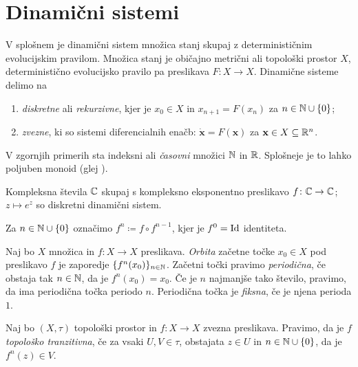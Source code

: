 \section{Dinamični sistemi} \label{sec:dis}

V splošnem je dinamični sistem množica stanj skupaj z determinističnim evolucijskim pravilom. Množica stanj je običajno metrični ali topološki prostor \(X\), deterministično evolucijsko pravilo pa preslikava \(F \colon X \to X\). Dinamične sisteme delimo na

\begin{enumerate}
    \item \emph{diskretne} ali \emph{rekurzivne}, kjer je \(x_0 \in X\) in \(x_{n + 1} = F (x_n)\) za \(n \in \mathbb N \cup \{0\}\);
    \item \emph{zvezne}, ki so sistemi diferencialnih enačb: \(\dot{\mathbf{x}} = F (\mathbf{x})\) za \(\mathbf{x} \in X \subseteq \mathbb R^n\).
\end{enumerate}

\noindent V zgornjih primerih sta indeksni ali \emph{časovni} množici \(\mathbb N\) in \(\mathbb R\). Splošneje je to lahko poljuben monoid (glej \cite{Giunti_2012}).

\begin{zgled}
    Kompleksna števila \(\mathbb C\) skupaj s kompleksno eksponentno preslikavo \(f \colon \mathbb C \to \mathbb C\); \(z \mapsto e^{z}\) so diskretni dinamični sistem.
\end{zgled}

\noindent Za \(n \in \mathbb N \cup \{0\}\) označimo \(f^n \coloneq f \circ f^{n - 1}\), kjer je \(f^0 = \operatorname{Id}\) identiteta.

\begin{definicija}
    Naj bo \(X\) množica in \(f \colon X \to X\) preslikava. \emph{Orbita} začetne točke \(x_0 \in X\) pod preslikavo \(f\) je zaporedje \(\{f^n (x_0)\}_{n \in \mathbb N}\). Začetni točki pravimo \emph{periodična}, če obstaja tak \(n \in \mathbb N\), da je \(f^n (x_0) = x_0\). Če je \(n\) najmanjše tako število, pravimo, da ima periodična točka periodo \(n\). Periodična točka je \emph{fiksna}, če je njena perioda \(\num{1}\).
\end{definicija}

\begin{definicija}
    Naj bo \((X, \tau)\) topološki prostor in \(f \colon X \to X\) zvezna preslikava. Pravimo, da je \(f\) \emph{topološko tranzitivna}, če za vsaki \(U, V \in \tau\), obstajata \(z \in U\) in \(n \in \mathbb N \cup \left\{ 0 \right\}\), da je \(f^n (z) \in V\).
\end{definicija}

